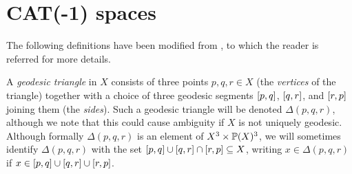 %



\bigskip
\section{CAT(-1) spaces}
\label{subsectionCAT}

The following definitions have been modified from \cite[p.158]{BridsonHaefliger}, to which the reader is referred for more details.

A \emph{geodesic triangle} in $X$ consists of three points $p,q,r\in X$ (the \emph{vertices} of the triangle) together with a choice of three geodesic segments $[p,q]$, $[q,r]$, and $[r,p]$ joining them (the \emph{sides}). Such a geodesic triangle will be denoted $\Delta(p,q,r)$, although we note that this could cause ambiguity if $X$ is not uniquely geodesic. Although formally $\Delta(p,q,r)$ is an element of $X^3\times \P(X)^3$, we will sometimes identify $\Delta(p,q,r)$ with the set $[p,q] \cup [q,r]\cap [r,p] \subseteq X$, writing $x\in\Delta(p,q,r)$ if $x\in [p,q] \cup [q,r]\cup [r,p]$.

